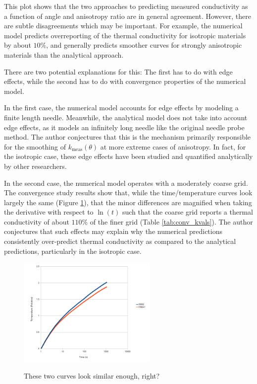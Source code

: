 This plot shows that the two approaches to predicting measured conductivity
as a function of angle and anisotropy ratio are in general agreement. However,
there are subtle disagreements which may be important. For example, the
numerical model predicts overreporting of the thermal conductivity for
isotropic materials by about \(10\%\), and generally predicts smoother
curves for strongly anisotropic materials than the analytical approach.

There are two potential explanations for this: The first has to do with edge
effects, while the second has to do with convergence properties of the numerical
model.

In the first case, the numerical model accounts for edge effects by
modeling a finite length needle. Meanwhile, the analytical model does not take
into account edge effects, as it models an infinitely long needle like the
original needle probe method. The author conjectures that this is the mechanism
primarily responsible for the smoothing of \(k_{\textrm{meas}}(\theta)\) at more extreme
cases of anisotropy. In fact, for the isotropic case, these edge effects have
been studied and quantified analytically by other researchers.


In the second case, the numerical model operates with a moderately coarse grid.
The convergence study results show that, while the time/temperature curves look
largely the same (Figure \ref{fig:conv_curves}), that the minor differences are magnified when taking the
derivative with respect to \(\ln(t)\) such that the coarse grid reports a
thermal conductivity of about \(110\%\) of the finer grid (Table \ref{tab:conv_kvals}). The author
conjectures that such effects may explain why the numerical predictions
consistently over-predict thermal conductivity as compared to the analytical
predictions, particularly in the isotropic case.


\begin{figure}[h]
\centering
\includegraphics[width=0.6\textwidth]{fig/conv_curves.png}
\label{fig:conv_curves}
\caption{These two curves look similar enough, right?}
\end{figure}


